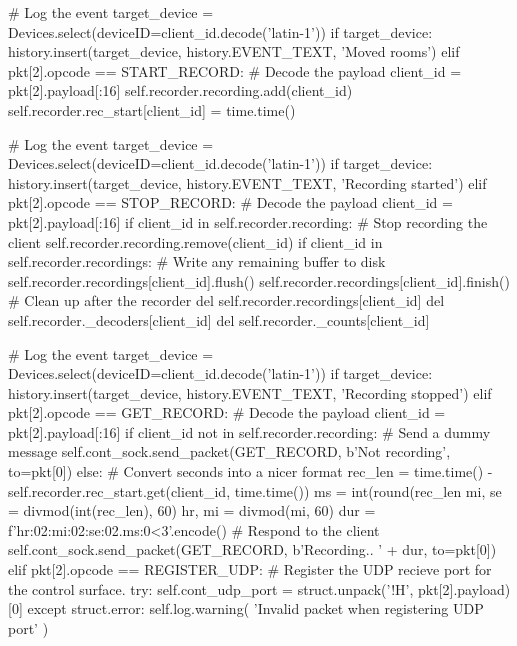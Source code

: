 \begin{pythoncode}
                # Log the event
                target_device = Devices.select(deviceID=client_id.decode('latin-1'))
                if target_device:
                    history.insert(target_device, history.EVENT_TEXT, 'Moved rooms')
            elif pkt[2].opcode == START_RECORD:
                # Decode the payload
                client_id = pkt[2].payload[:16]
                self.recorder.recording.add(client_id)
                self.recorder.rec_start[client_id] = time.time()

                # Log the event
                target_device = Devices.select(deviceID=client_id.decode('latin-1'))
                if target_device:
                    history.insert(target_device, history.EVENT_TEXT, 'Recording started')
            elif pkt[2].opcode == STOP_RECORD:
                # Decode the payload
                client_id = pkt[2].payload[:16]
                if client_id in self.recorder.recording:
                    # Stop recording the client
                    self.recorder.recording.remove(client_id)
                    if client_id in self.recorder.recordings:
                        # Write any remaining buffer to disk
                        self.recorder.recordings[client_id].flush()
                        self.recorder.recordings[client_id].finish()
                        # Clean up after the recorder
                        del self.recorder.recordings[client_id]
                        del self.recorder._decoders[client_id]
                        del self.recorder._counts[client_id]
                
                # Log the event
                target_device = Devices.select(deviceID=client_id.decode('latin-1'))
                if target_device:
                    history.insert(target_device, history.EVENT_TEXT, 'Recording stopped')
            elif pkt[2].opcode == GET_RECORD:
                # Decode the payload
                client_id = pkt[2].payload[:16]
                if client_id not in self.recorder.recording:
                    # Send a dummy message
                    self.cont_sock.send_packet(GET_RECORD, b'Not recording', to=pkt[0])
                else:
                    # Convert seconds into a nicer format
                    rec_len = time.time() - self.recorder.rec_start.get(client_id, time.time())
                    ms = int(round(rec_len %
                    mi, se = divmod(int(rec_len), 60)
                    hr, mi = divmod(mi, 60)
                    dur = f'{hr:02}:{mi:02}:{se:02}.{ms:0<3}'.encode()
                    # Respond to the client
                    self.cont_sock.send_packet(GET_RECORD, b'Recording.. ' + dur, to=pkt[0])
            elif pkt[2].opcode == REGISTER_UDP:
                # Register the UDP recieve port for the control surface.
                try:
                    self.cont_udp_port = struct.unpack('!H', pkt[2].payload)[0]
                except struct.error:
                    self.log.warning(
                        'Invalid packet when registering UDP port'
                    )


\end{pythoncode}
